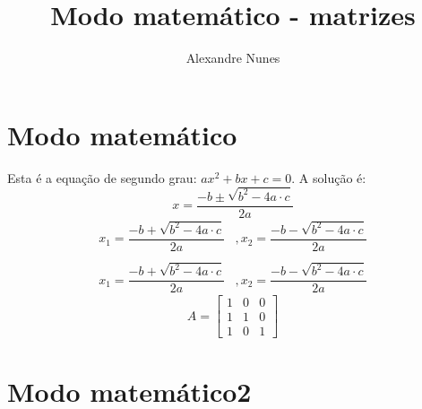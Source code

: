 \documentclass{article}
\begin{document}
	
	\title{\textbf{{\Huge Modo matemático - matrizes}}} %
	\author{Alexandre Nunes} %
	\maketitle %
	\thispagestyle{empty} %
	\newpage
	
	\setcounter{page}{1} %
	\tableofcontents %
	\newpage
	
	\listoffigures %
	\newpage
	
	\listoftables %
	\newpage

	\setcounter{page}{1} %
	
	\section{Modo matemático}

    Esta é a equação de segundo grau: $ ax^2 +bx +c=0 $. A solução é:
    \begin{equation*}
    	x = \frac{-b \pm \sqrt{b^2 -4a\cdot c}}{2a}
    \end{equation*}
    \begin{equation*}
    	\begin{array}{cc}
    	x_1 = \dfrac{-b + \sqrt{b^2 -4a\cdot c}}{2a}& ,
    	x_2 = \dfrac{-b - \sqrt{b^2 -4a\cdot c}}{2a} \\ \\
    	x_1 = \dfrac{-b + \sqrt{b^2 -4a\cdot c}}{2a}& ,
    	x_2 = \dfrac{-b - \sqrt{b^2 -4a\cdot c}}{2a}
    	\end{array} 
    \end{equation*}
    \begin{equation*}
    	A = \begin{bmatrix}
    	1 & 0  & 0  \\ 
    	1 & 1  & 0  \\ 
    	1 & 0  & 1
    	\end{bmatrix} 
    \end{equation*}
    
    \section{Modo matemático2}
    
\end{document}
